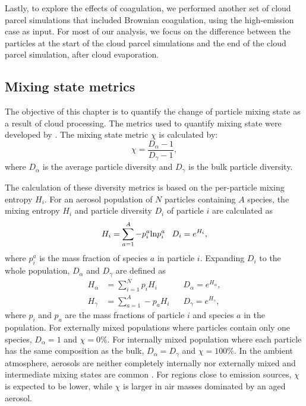 \documentclass[edeposit,fullpage]{uiucthesis2009}
\begin{document}
Lastly, to explore the effects of coagulation, we performed another
set of cloud parcel simulations that included Brownian coagulation,
using the high-emission case as input. For most of our
analysis, we focus on the difference between the particles at the
start of the cloud parcel simulations and the end of the cloud parcel
simulation, after cloud evaporation.

\subsection{Mixing state metrics}
\label{sec:mixing_state_metrics}
The objective of this chapter is to quantify the change of particle
mixing state as a result of cloud processing. The metrics used to
quantify mixing state were developed by \citet{Riemer2013a}. The
mixing state metric $\chi$ is calculated by:
\begin{equation} \label{eq:chi}
    \chi = \frac{{D}_{\alpha}-1}{{D}_{\gamma}-1},
\end{equation}
where $D_{\alpha}$ is the average particle diversity and
$D_{\gamma}$ is the bulk particle diversity.

The calculation of these diversity metrics is based on the
per-particle mixing entropy $H_i$. For an aerosol population of $N$
particles containing $A$ species, the mixing entropy $H_i$ and
particle diversity $D_i$ of particle $i$ are calculated as
\begin{equation}\label{eq:H-i}
    H_i = \sum_{a=1}^{A}-p_i^a {\rm ln}p_i^a  \;\;\;D_i = e^{H_i}, 
\end{equation}
where $p_i^a$ is the mass fraction of species $a$ in particle
$i$. Expanding $D_i$ to the whole population, $D_\alpha$ and
$D_{\gamma}$ are defined as
  \begin{align}
    H_\alpha &= \sum_{i=1}^N p_i H_i\;\;\;&D_\alpha= e^{H_\alpha}, \label{eq:H-alpha}\\
    H_\gamma &= \sum_{a=1}^A -p_a H_i\;\;\;&D_\gamma= e^{H_\gamma}, \label{eq:H-gamma}
  \end{align}
where $p_i$ and $p_a$ are the mass fractions of particle $i$ and
species $a$ in the population. For externally mixed populations where
particles contain only one species, $D_\alpha =1$ and $\chi =0\%$. For
internally mixed population where each particle has the same
composition as the bulk, $D_\alpha = D_\gamma $ and $\chi =100\%$. In
the ambient atmosphere, aerosols are neither completely internally nor
externally mixed and intermediate mixing states are common
\citep{Healy2014,Ye2018,Ching2019}. For regions close to emission
sources, $\chi$ is expected to be lower, while $\chi$ is larger in air
masses dominated by an aged aerosol. 
\end{document}
